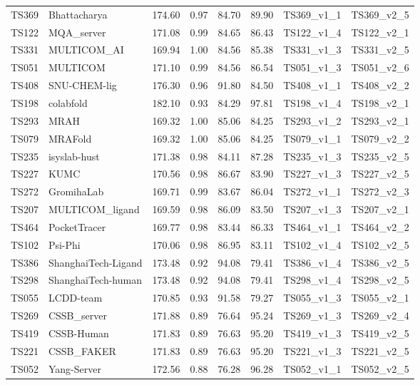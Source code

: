 \begin{longtable}{llllllll}
TS369 & Bhattacharya & 174.60 & 0.97 & 84.70 & 89.90 & TS369\_v1\_1 & TS369\_v2\_5 \\ 
TS122 & MQA\_server & 171.08 & 0.99 & 84.65 & 86.43 & TS122\_v1\_4 & TS122\_v2\_1 \\ 
TS331 & MULTICOM\_AI & 169.94 & 1.00 & 84.56 & 85.38 & TS331\_v1\_3 & TS331\_v2\_5 \\ 
TS051 & MULTICOM & 171.10 & 0.99 & 84.56 & 86.54 & TS051\_v1\_3 & TS051\_v2\_6 \\ 
TS408 & SNU-CHEM-lig & 176.30 & 0.96 & 91.80 & 84.50 & TS408\_v1\_1 & TS408\_v2\_2 \\ 
TS198 & colabfold & 182.10 & 0.93 & 84.29 & 97.81 & TS198\_v1\_4 & TS198\_v2\_1 \\ 
TS293 & MRAH & 169.32 & 1.00 & 85.06 & 84.25 & TS293\_v1\_2 & TS293\_v2\_1 \\ 
TS079 & MRAFold & 169.32 & 1.00 & 85.06 & 84.25 & TS079\_v1\_1 & TS079\_v2\_2 \\ 
TS235 & isyslab-hust & 171.38 & 0.98 & 84.11 & 87.28 & TS235\_v1\_3 & TS235\_v2\_5 \\ 
TS227 & KUMC & 170.56 & 0.98 & 86.67 & 83.90 & TS227\_v1\_3 & TS227\_v2\_5 \\ 
TS272 & GromihaLab & 169.71 & 0.99 & 83.67 & 86.04 & TS272\_v1\_1 & TS272\_v2\_3 \\ 
TS207 & MULTICOM\_ligand & 169.59 & 0.98 & 86.09 & 83.50 & TS207\_v1\_3 & TS207\_v2\_1 \\ 
TS464 & PocketTracer & 169.77 & 0.98 & 83.44 & 86.33 & TS464\_v1\_1 & TS464\_v2\_2 \\ 
TS102 & Psi-Phi & 170.06 & 0.98 & 86.95 & 83.11 & TS102\_v1\_4 & TS102\_v2\_5 \\ 
TS386 & ShanghaiTech-Ligand & 173.48 & 0.92 & 94.08 & 79.41 & TS386\_v1\_4 & TS386\_v2\_5 \\ 
TS298 & ShanghaiTech-human & 173.48 & 0.92 & 94.08 & 79.41 & TS298\_v1\_4 & TS298\_v2\_5 \\ 
TS055 & LCDD-team & 170.85 & 0.93 & 91.58 & 79.27 & TS055\_v1\_3 & TS055\_v2\_1 \\ 
TS269 & CSSB\_server & 171.88 & 0.89 & 76.64 & 95.24 & TS269\_v1\_3 & TS269\_v2\_4 \\ 
TS419 & CSSB-Human & 171.83 & 0.89 & 76.63 & 95.20 & TS419\_v1\_3 & TS419\_v2\_5 \\ 
TS221 & CSSB\_FAKER & 171.83 & 0.89 & 76.63 & 95.20 & TS221\_v1\_3 & TS221\_v2\_5 \\ 
TS052 & Yang-Server & 172.56 & 0.88 & 76.28 & 96.28 & TS052\_v1\_1 & TS052\_v2\_5 \\ 

\end{longtable}
